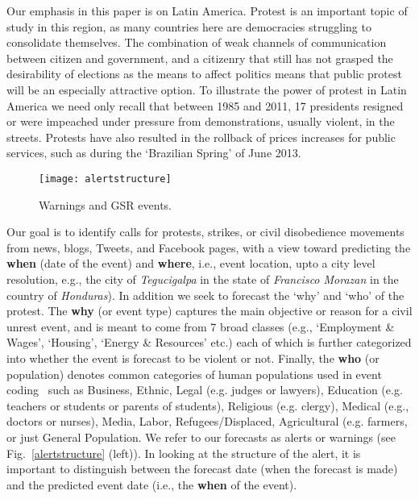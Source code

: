 Our emphasis in this paper is on Latin America.
Protest is an important topic of study in this
region, as many countries here are democracies struggling to consolidate themselves.
The combination of weak channels of communication between citizen and government, and a citizenry that still 
has not grasped the desirability of elections as the means to affect politics means that public protest 
will be an especially attractive option. To illustrate the power of protest in Latin America we need 
only recall that between 1985 and 2011, 17 presidents resigned or were impeached under pressure from 
demonstrations, usually violent, in the streets. Protests have also resulted 
in the rollback of prices increases for public services, such as during the `Brazilian Spring' of June 2013.

\begin{figure}
    \texttt{[image: alertstructure]}
    \caption{Warnings and GSR events. }
    \label{fig:alertstructure}
\end{figure}

Our goal is to identify calls for protests, strikes, or civil disobedience movements from news, blogs, Tweets, and Facebook
pages, with a view toward predicting the {\bf when} (date of the event) and {\bf where}, i.e.,
event location, upto a city level resolution, e.g., 
the city of {\it Tegucigalpa} in the state of {\it Francisco Morazan} in the country of {\it Honduras}).
In addition we seek to forecast the `why' and `who' of the protest.
The {\bf why} (or event type)
captures the main objective or reason for a civil unrest event,
and is meant to come from 7 broad classes (e.g., `Employment \& Wages',
`Housing', `Energy \& Resources' etc.) each of which is further categorized into
whether the event is forecast to be violent or not.
Finally, the {\bf who} (or population)
denotes common categories of human populations
used in event coding~\cite{philschrodt}
such as
Business, Ethnic, Legal (e.g. judges or lawyers), Education (e.g. teachers or students or parents of students), Religious (e.g. clergy), Medical (e.g., doctors or nurses), Media, Labor, Refugees/Displaced, Agricultural (e.g. farmers,
or just General Population. We refer to our forecasts as alerts or warnings (see Fig.~\ref{alertstructure} (left)).
In looking at the structure of the alert, it is important to distinguish between the forecast date (when the forecast is made)
and the predicted event date (i.e., the {\bf when} of the event).

